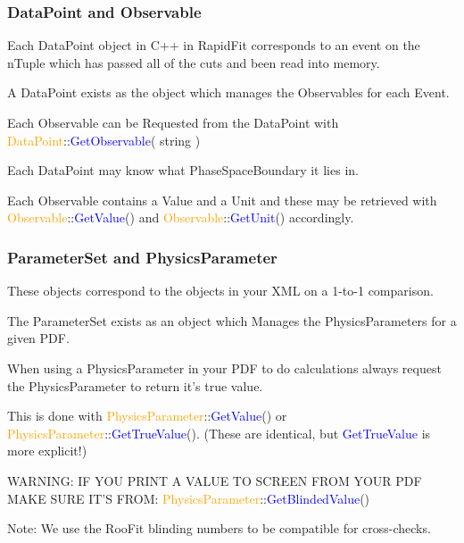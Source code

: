 \documentclass{beamer}
\begin{document}
\begin{frame}
\frametitle{DataPoint and Observable}
Each DataPoint object in C++ in RapidFit corresponds to an event on the nTuple which has passed all of the cuts and been read into memory.\newline

A DataPoint exists as the object which manages the Observables for each Event.\newline

Each Observable can be Requested from the DataPoint with \textcolor{orange}{DataPoint}::\textcolor{blue}{GetObservable}( string )\newline

Each DataPoint may know what PhaseSpaceBoundary it lies in.\newline

Each Observable contains a Value and a Unit and these may be retrieved with \textcolor{orange}{Observable}::\textcolor{blue}{GetValue}() and \textcolor{orange}{Observable}::\textcolor{blue}{GetUnit}() accordingly.

\end{frame}

\begin{frame}
\frametitle{ParameterSet and PhysicsParameter}
\scriptsize
These objects correspond to the objects in your XML on a 1-to-1 comparison.\newline\newline

The ParameterSet exists as an object which Manages the PhysicsParameters for a given PDF.\newline

When using a PhysicsParameter in your PDF to do calculations always request the PhysicsParameter to return it's true value.\newline\newline

This is done with \textcolor{orange}{PhysicsParameter}::\textcolor{blue}{GetValue}() or \textcolor{orange}{PhysicsParameter}::\textcolor{blue}{GetTrueValue}().
(These are identical, but \textcolor{blue}{GetTrueValue} is more explicit!)\newline\newline


WARNING: IF YOU PRINT A VALUE TO SCREEN FROM YOUR PDF MAKE SURE IT'S FROM:\newline
\textcolor{orange}{PhysicsParameter}::\textcolor{blue}{GetBlindedValue}()\newline


\tiny
Note: We use the RooFit blinding numbers to be compatible for cross-checks.

\end{frame}
\end{document}
